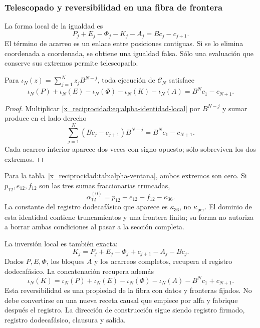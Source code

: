 \subsubsection{Telescopado y reversibilidad en una fibra de frontera}
\label{x_reciprocidad:subsec:alpha-telescopia}

La forma local de la igualdad es
\begin{equation}
 P_j+E_j-\Phi_j-K_j-A_j=Bc_j-c_{j+1}.
 \label{x_reciprocidad:eq:alpha-identidad-local}
\end{equation}
El término de acarreo es un enlace entre posiciones contiguas. Si se lo
elimina coordenada a coordenada, se obtiene una igualdad falsa. Sólo una
evaluación que conserve sus extremos permite telescoparlo.

\begin{proposition}
\label{x_reciprocidad:prop:alpha-telescopia}
Para \(\iota_N(z)=\sum_{j=1}^{N}z_jB^{N-j}\), toda ejecución de
\(\mathcal C_N\) satisface
\begin{equation}
 \iota_N(P)+\iota_N(E)-\iota_N(\Phi)-\iota_N(K)-\iota_N(A)
 =B^Nc_1-c_{N+1}.
 \label{x_reciprocidad:eq:alpha-telescopia}
\end{equation}
\end{proposition}

\begin{proof}
Multiplicar \eqref{x_reciprocidad:eq:alpha-identidad-local} por \(B^{N-j}\) y sumar
produce en el lado derecho
\[
 \sum_{j=1}^{N}(Bc_j-c_{j+1})B^{N-j}=B^Nc_1-c_{N+1}.
\]
Cada acarreo interior aparece dos veces con signo opuesto; sólo sobreviven
los dos extremos.
\end{proof}

Para la tabla~\ref{x_reciprocidad:tab:alpha-ventana}, ambos extremos son cero. Si
\(p_{12},e_{12},f_{12}\) son las tres sumas fraccionarias truncadas,
\[
 \alpha_{12}^{(0)}=p_{12}+e_{12}-f_{12}-\kappa_{36}.
\]
La constante del registro dodecafásico que aparece es \(\kappa_{36}\), no
\(\kappa_{\mathrm{per}}\). El dominio de esta identidad contiene
truncamientos y una frontera finita; su forma no autoriza a borrar ambas
condiciones al pasar a la sección completa.

La inversión local es también exacta:
\[
 K_j=P_j+E_j-\Phi_j+c_{j+1}-A_j-Bc_j.
\]
Dados \(P,E,\Phi\), los bloques \(A\) y los acarreos completos,
recupera el registro dodecafásico. La concatenación recupera además
\[
 \iota_N(K)=\iota_N(P)+\iota_N(E)-\iota_N(\Phi)-\iota_N(A)
             -B^Nc_1+c_{N+1}.
\]
Esta reversibilidad es una propiedad de la fibra con datos y fronteras
fijados. No debe convertirse en una nueva receta causal que empiece por
alfa y fabrique después el registro. La dirección de construcción sigue
siendo registro firmado, registro dodecafásico, clausura y salida.

